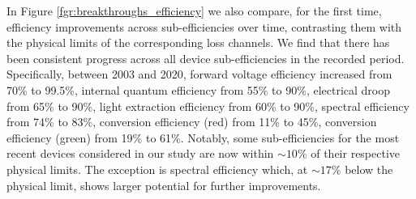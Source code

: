 \documentclass[parskip=full]{article}
\begin{document}
In Figure \ref{fgr:breakthroughs_efficiency} we also compare, for the first time, efficiency improvements across sub-efficiencies over time, contrasting them with the physical limits of the corresponding loss channels. We find that there has been consistent progress across all device sub-efficiencies in the recorded period. Specifically, between 2003 and 2020, forward voltage efficiency increased from 70\% to 99.5\%, internal quantum efficiency from 55\% to 90\%, electrical droop from 65\% to 90\%, light extraction efficiency from 60\% to 90\%, spectral efficiency from 74\% to 83\%, conversion efficiency (red) from 11\% to 45\%, conversion efficiency (green) from 19\% to 61\%. Notably, some sub-efficiencies for the most recent devices considered in our study are now within $\sim10\%$ of their respective physical limits. The exception is spectral efficiency which, at $\sim17\%$ below the physical limit, shows larger potential for further improvements.
\end{document}

